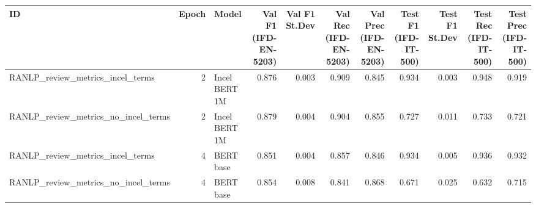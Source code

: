 \begin{tabular}{lrlrrrrrrrr}
\toprule
                                 ID &  Epoch &         Model &  Val F1 (IFD-EN-5203) &  Val F1 St.Dev &  Val Rec (IFD-EN-5203) &  Val Prec (IFD-EN-5203) &  Test F1 (IFD-IT-500) &  Test F1 St.Dev &  Test Rec (IFD-IT-500) &  Test Prec (IFD-IT-500) \\
\midrule
   RANLP\_review\_metrics\_incel\_terms &      2 & Incel BERT 1M &                 0.876 &          0.003 &                  0.909 &                   0.845 &                 0.934 &           0.003 &                  0.948 &                   0.919 \\
RANLP\_review\_metrics\_no\_incel\_terms &      2 & Incel BERT 1M &                 0.879 &          0.004 &                  0.904 &                   0.855 &                 0.727 &           0.011 &                  0.733 &                   0.721 \\
   RANLP\_review\_metrics\_incel\_terms &      4 &     BERT base &                 0.851 &          0.004 &                  0.857 &                   0.846 &                 0.934 &           0.005 &                  0.936 &                   0.932 \\
RANLP\_review\_metrics\_no\_incel\_terms &      4 &     BERT base &                 0.854 &          0.008 &                  0.841 &                   0.868 &                 0.671 &           0.025 &                  0.632 &                   0.715 \\
\bottomrule
\end{tabular}
